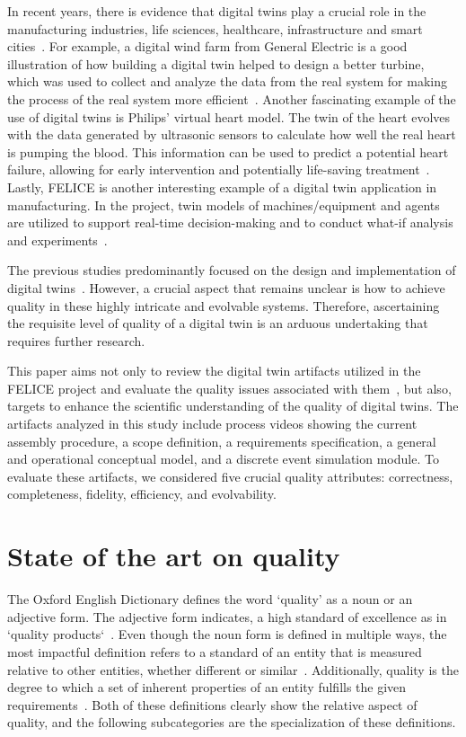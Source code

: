 \documentclass{llncs}
\begin{document}
    In recent years, there is evidence that digital twins play a crucial role in the manufacturing industries, 
    life sciences, healthcare, infrastructure and smart cities~\cite{Review2}.
    For example, a digital wind farm from General Electric is a good illustration of how building a digital twin helped to design a better turbine, 
    which was used to collect and analyze the data from the real system for making the process of the real system more efficient~\cite{GeneralElectricWindTurbine}. 
    Another fascinating example of the use of digital twins is Philips' virtual heart model. The twin of the heart evolves with the data generated by ultrasonic sensors to calculate 
    how well the real heart is pumping the blood. This information can be used to predict a potential heart failure, allowing for early intervention and potentially life-saving treatment~\cite{PhilipsHearth}. 
    Lastly, FELICE is another interesting example of a digital twin application in manufacturing. In the project, twin models of machines/equipment and 
    agents are utilized to support real-time decision-making and to conduct what-if analysis and experiments~\cite{FELICE}.
    
    The previous studies predominantly focused on the design and implementation of digital twins~\cite{Review1, Review2}. 
    However, a crucial aspect that remains unclear is how to achieve quality in these highly intricate and evolvable systems. 
    Therefore, ascertaining the requisite level of quality of a digital twin is an arduous undertaking that requires further research.

    This paper aims not only to review the digital twin artifacts utilized in the FELICE project and evaluate the quality issues associated with them~\cite{FELICE},  
    but also, targets to enhance the scientific understanding of the quality of digital twins. The artifacts analyzed in this study include process videos showing the current assembly procedure, 
    a scope definition, a requirements specification, a general and operational conceptual model, and a discrete event simulation module. 
    To evaluate these artifacts, we considered five crucial quality attributes: correctness, completeness, fidelity, efficiency, and evolvability.

    \section{State of the art on quality}
    The Oxford English Dictionary defines the word `quality' as a noun or an adjective form. The adjective form indicates, 
    a high standard of excellence as in  `quality products`~\cite{OxfordDictionary}. Even though the noun form is defined in multiple ways, the most impactful 
    definition refers to a  standard of an entity that is measured relative to other entities, whether different or similar~\cite{OxfordDictionary}.  
    Additionally, quality is the degree to which a set of inherent properties of an entity fulfills the given requirements~\cite{ISO9000}.
    Both of these definitions clearly show the relative aspect of quality, and the following subcategories are the specialization of these definitions.
\end{document}

